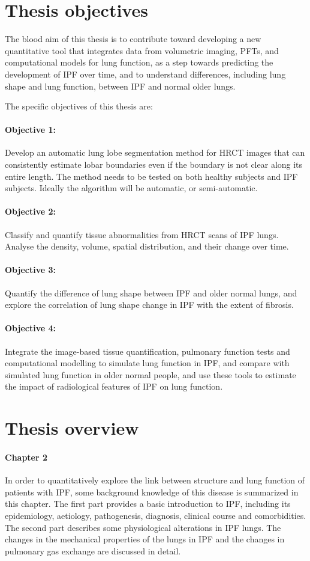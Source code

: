 \section{Thesis objectives} \label{ThesisObjective}
The blood aim of this thesis is to contribute toward developing a new quantitative tool that integrates data from volumetric imaging, PFTs, and computational models for lung function, as a step towards predicting the development of IPF over time, and to understand differences, including lung shape and lung function, between IPF and normal older lungs. 

The specific objectives of this thesis are:

\paragraph{Objective 1:} Develop an automatic lung lobe segmentation method for HRCT images that can consistently estimate lobar boundaries even if the boundary is not clear along its entire length. The method needs to be tested on both healthy subjects and IPF subjects. Ideally the algorithm will be automatic, or semi-automatic.
\paragraph{Objective 2:} Classify and quantify tissue abnormalities from HRCT scans of IPF lungs. Analyse the density, volume, spatial distribution, and their change over time.
\paragraph{Objective 3:} Quantify the difference of lung shape between IPF and older normal lungs, and explore the correlation of lung shape change in IPF with the extent of fibrosis.
\paragraph{Objective 4:} Integrate the image-based tissue quantification, pulmonary function tests and computational modelling to simulate lung function in IPF, and compare with simulated lung function in older normal people, and use these tools to estimate the impact of radiological features of IPF on lung function.

\section{Thesis overview}
\paragraph{Chapter 2} In order to quantitatively explore the link between structure and lung function of patients with IPF, some background knowledge of this disease is summarized in this chapter. The first part provides a basic introduction to IPF, including its epidemiology, aetiology, pathogenesis, diagnosis, clinical course and comorbidities. The second part describes some physiological alterations in IPF lungs. The changes in the mechanical properties of the lungs in IPF and the changes in pulmonary gas exchange are discussed in detail.
